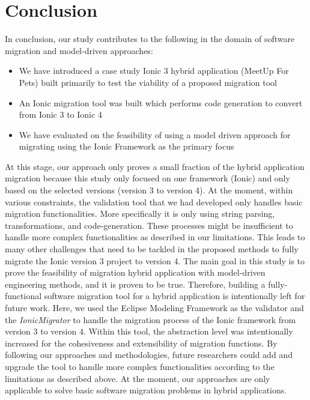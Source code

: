 \documentclass[conference]{IEEEtran}
\begin{document}
\section{Conclusion}
In conclusion, our study contributes to the following in the domain of software migration and model-driven approaches:
\begin{itemize}
    \item We have introduced a case study Ionic 3 hybrid application (MeetUp For Pets) built primarily to test the viability of a proposed migration tool
    \item An Ionic migration tool was built which performs code generation to convert from Ionic 3 to Ionic 4
    \item We have evaluated on the feasibility of using a model driven approach for migrating using the Ionic Framework as the primary focus
\end{itemize}
At this stage, our approach only proves a small fraction of the hybrid application migration because
this study only focused on one framework (Ionic) and only based on the selected versions (version 3 to version 4).
\newline
At the moment, within various constraints, the validation tool that we had developed only handles basic migration functionalities.
More specifically it is only using string parsing, transformations, and code-generation. These processes might
be insufficient to handle more complex functionalities as described in our limitations.
\newline
This leads to many other challenges that need to be tackled in the proposed methods to fully migrate the Ionic version 3 project
to version 4. The main goal in this study is to prove the feasibility of migration hybrid application with model-driven engineering
methods, and it is proven to be true. Therefore, building a fully-functional software migration tool for a hybrid application is intentionally
left for future work.
\newline
Here, we used the Eclipse Modeling Framework as the validator and the \textit{IonicMigrator} to handle the migration process of the Ionic framework from version 3 to version 4. Within this tool, the abstraction level was intentionally
increased for the cohesiveness and extensibility of migration functions. By following our approaches and methodologies,
future researchers could add and upgrade the tool to handle more complex functionalities according
to the limitations as described above.
\newline
At the moment, our approaches are only applicable to solve basic software migration problems in hybrid applications.
\end{document}
